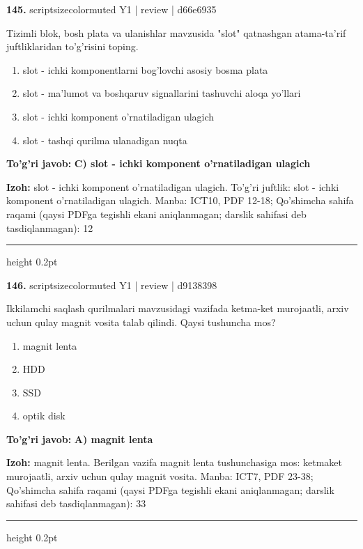 \documentclass[10pt,a4paper]{article}
\begin{document}
{\bfseries\sffamily\color{ink} 145.} {scriptsizecolor{muted} Y1 | review | d66e6935}
\par
Tizimli blok, bosh plata va ulanishlar mavzusida "slot" qatnashgan atama-ta'rif juftliklaridan to'g'risini toping.
\begin{enumerate}[label=\Alph*),leftmargin=9mm]
\item slot - ichki komponentlarni bog'lovchi asosiy bosma plata
\item slot - ma'lumot va boshqaruv signallarini tashuvchi aloqa yo'llari
\item slot - ichki komponent o'rnatiladigan ulagich
\item slot - tashqi qurilma ulanadigan nuqta
\end{enumerate}
\begin{tcolorbox}[enhanced,breakable,colback=teal!4,colframe=teal!60!black,boxrule=0.45pt,arc=1.2mm,left=2.7mm,right=2.7mm,top=1.8mm,bottom=1.8mm,before skip=2mm,after skip=2mm]
{\bfseries\sffamily\color{teal}To'g'ri javob:} \textbf{C) slot - ichki komponent o'rnatiladigan ulagich}
\par\smallskip
{\bfseries Izoh:} slot - ichki komponent o'rnatiladigan ulagich. To'g'ri juftlik: slot - ichki komponent o'rnatiladigan ulagich. Manba: ICT10, PDF 12-18; Qo'shimcha sahifa raqami (qaysi PDFga tegishli ekani aniqlanmagan; darslik sahifasi deb tasdiqlanmagan): 12
\end{tcolorbox}
\vspace{2mm}\hrule height 0.2pt\vspace{3mm}

{\bfseries\sffamily\color{ink} 146.} {scriptsizecolor{muted} Y1 | review | d9138398}
\par
Ikkilamchi saqlash qurilmalari mavzusidagi vazifada ketma-ket murojaatli, arxiv uchun qulay magnit vosita talab qilindi. Qaysi tushuncha mos?
\begin{enumerate}[label=\Alph*),leftmargin=9mm]
\item magnit lenta
\item HDD
\item SSD
\item optik disk
\end{enumerate}
\begin{tcolorbox}[enhanced,breakable,colback=teal!4,colframe=teal!60!black,boxrule=0.45pt,arc=1.2mm,left=2.7mm,right=2.7mm,top=1.8mm,bottom=1.8mm,before skip=2mm,after skip=2mm]
{\bfseries\sffamily\color{teal}To'g'ri javob:} \textbf{A) magnit lenta}
\par\smallskip
{\bfseries Izoh:} magnit lenta. Berilgan vazifa magnit lenta tushunchasiga mos: ketmaket murojaatli, arxiv uchun qulay magnit vosita. Manba: ICT7, PDF 23-38; Qo'shimcha sahifa raqami (qaysi PDFga tegishli ekani aniqlanmagan; darslik sahifasi deb tasdiqlanmagan): 33
\end{tcolorbox}
\vspace{2mm}\hrule height 0.2pt\vspace{3mm}
\end{document}
